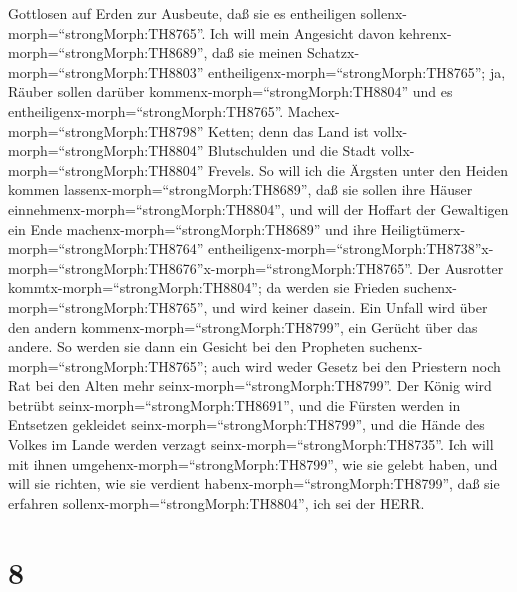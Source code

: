 Gottlosen auf Erden zur Ausbeute, daß sie es entheiligen
sollenx-morph=``strongMorph:TH8765''.  Ich will mein
Angesicht davon kehrenx-morph=``strongMorph:TH8689'', daß sie meinen
Schatzx-morph=``strongMorph:TH8803''
entheiligenx-morph=``strongMorph:TH8765''; ja, Räuber sollen darüber
kommenx-morph=``strongMorph:TH8804'' und es
entheiligenx-morph=``strongMorph:TH8765''. 
Machex-morph=``strongMorph:TH8798'' Ketten; denn das Land ist
vollx-morph=``strongMorph:TH8804'' Blutschulden und die Stadt
vollx-morph=``strongMorph:TH8804'' Frevels.  So will ich
die Ärgsten unter den Heiden kommen
lassenx-morph=``strongMorph:TH8689'', daß sie sollen ihre Häuser
einnehmenx-morph=``strongMorph:TH8804'', und will der Hoffart der
Gewaltigen ein Ende machenx-morph=``strongMorph:TH8689'' und ihre
Heiligtümerx-morph=``strongMorph:TH8764''
entheiligenx-morph=``strongMorph:TH8738''\textbar x-morph=``strongMorph:TH8676''x-morph=``strongMorph:TH8765''.
 Der Ausrotter kommtx-morph=``strongMorph:TH8804''; da
werden sie Frieden suchenx-morph=``strongMorph:TH8765'', und wird keiner
dasein.  Ein Unfall wird über den andern
kommenx-morph=``strongMorph:TH8799'', ein Gerücht über das andere. So
werden sie dann ein Gesicht bei den Propheten
suchenx-morph=``strongMorph:TH8765''; auch wird weder Gesetz bei den
Priestern noch Rat bei den Alten mehr
seinx-morph=``strongMorph:TH8799''.  Der König wird betrübt
seinx-morph=``strongMorph:TH8691'', und die Fürsten werden in Entsetzen
gekleidet seinx-morph=``strongMorph:TH8799'', und die Hände des Volkes
im Lande werden verzagt seinx-morph=``strongMorph:TH8735''. Ich will mit
ihnen umgehenx-morph=``strongMorph:TH8799'', wie sie gelebt haben, und
will sie richten, wie sie verdient habenx-morph=``strongMorph:TH8799'',
daß sie erfahren sollenx-morph=``strongMorph:TH8804'', ich sei der HERR.

\hypertarget{section-7}{%
\section{8}\label{section-7}}

